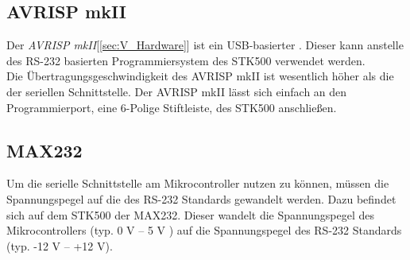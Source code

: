 \subsection{AVRISP mkII}
\label{sec:AVRISP}
Der \emph{AVRISP mkII}[\ref{sec:V_Hardware}] ist ein USB-basierter . Dieser kann anstelle des RS-232 basierten Programmiersystem des STK500 verwendet werden.\\
Die Übertragungsgeschwindigkeit des AVRISP mkII ist wesentlich höher als die der seriellen Schnittstelle. 
Der AVRISP mkII lässt sich einfach an den Programmierport, eine 6-Polige Stiftleiste, des STK500 anschließen.

\subsection{MAX232}
\label{sec:MAX232}
Um die serielle Schnittstelle am Mikrocontroller nutzen zu können, müssen die Spannungspegel auf die des RS-232 Standards gewandelt werden. Dazu befindet sich auf dem STK500 der  MAX232. 
Dieser wandelt die Spannungspegel des Mikrocontrollers (typ. 0 V -- 5 V ) auf die Spannungspegel des RS-232 Standards (typ. -12 V -- +12 V).
